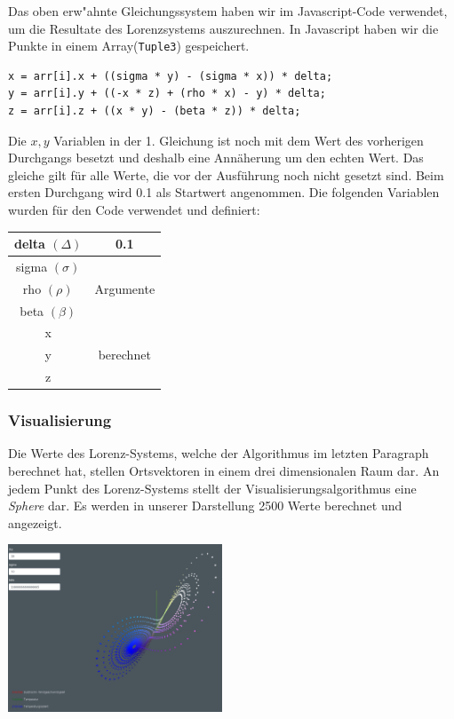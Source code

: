 Das oben erw"ahnte Gleichungssystem haben wir im Javascript-Code verwendet, um die Resultate des Lorenzsystems auszurechnen. In Javascript haben wir die Punkte in einem Array(\texttt{Tuple3}) gespeichert.

\begin{centerFigure}
\begin{lstlisting}
x = arr[i].x + ((sigma * y) - (sigma * x)) * delta;
y = arr[i].y + ((-x * z) + (rho * x) - y) * delta;
z = arr[i].z + ((x * y) - (beta * z)) * delta;
\end{lstlisting}
\end{centerFigure}

Die $ x, y $ Variablen in der 1. Gleichung ist noch mit dem Wert des vorherigen Durchgangs besetzt und deshalb eine Annäherung um den echten Wert. Das gleiche gilt für alle Werte, die vor der Ausführung noch nicht gesetzt sind. Beim ersten Durchgang wird 0.1 als Startwert angenommen. Die folgenden Variablen wurden für den Code verwendet und definiert:

\begin{centerFigure}
	\begin{tabular}{| c | c |}
		\hline
		delta $ (\Delta) $ & 0.1 \\\hline
		sigma $ (\sigma) $ & \multirow{3}{*}{Argumente}\\
		rho $(\rho) $ & \\
		beta $ (\beta) $ & \\\hline
		x & \multirow{3}{*}{berechnet}\\
		y & \\
		z & \\\hline
	\end{tabular}
\end{centerFigure}

\subsubsection{Visualisierung}
Die Werte des Lorenz-Systems, welche der Algorithmus im letzten Paragraph berechnet hat, stellen Ortsvektoren in einem drei dimensionalen Raum dar. An jedem Punkt des Lorenz-Systems stellt der Visualisierungsalgorithmus eine \textit{Sphere} dar. Es werden in unserer Darstellung 2500 Werte berechnet und angezeigt.

\begin{centerFigure}
	\includegraphics[height=5cm]{lorenz/assets/implementation/Visualisierung}
\end{centerFigure}

